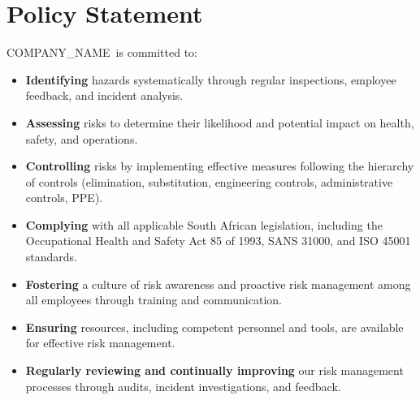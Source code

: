\documentclass[11pt]{article}
\newcommand{\clientName}{{{COMPANY_NAME}}}
\begin{document}
\section{Policy Statement}
\clientName\ is committed to:
\begin{itemize}
    \item \textbf{Identifying} hazards systematically through regular inspections, employee feedback, and incident analysis.
    \item \textbf{Assessing} risks to determine their likelihood and potential impact on health, safety, and operations.
    \item \textbf{Controlling} risks by implementing effective measures following the hierarchy of controls (elimination, substitution, engineering controls, administrative controls, PPE).
    \item \textbf{Complying} with all applicable South African legislation, including the Occupational Health and Safety Act 85 of 1993, SANS 31000, and ISO 45001 standards.
    \item \textbf{Fostering} a culture of risk awareness and proactive risk management among all employees through training and communication.
    \item \textbf{Ensuring} resources, including competent personnel and tools, are available for effective risk management.
    \item \textbf{Regularly reviewing and continually improving} our risk management processes through audits, incident investigations, and feedback.
\end{itemize}
\end{document}
